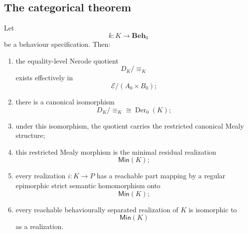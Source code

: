 \subsection{The categorical theorem}
\label{subsec:categorical-myhill-nerode-theorem}

\begin{theorem}
\label{thm:categorical-myhill-nerode}
    Let
    \[
        k:K\to\mathbf{Beh}_0
    \]
    be a behaviour specification. Then:
    \begin{enumerate}
        \item the equality-level Nerode quotient
        \[
            D_K/{\equiv_K}
        \]
        exists effectively in
        \[
            \mathcal E/(A_0\times B_0);
        \]

        \item there is a canonical isomorphism
        \[
            D_K/{\equiv_K}\cong\operatorname{Der}_0(K);
        \]

        \item under this isomorphism, the quotient carries the restricted canonical Mealy structure;

        \item this restricted Mealy morphism is the minimal residual realization
        \[
            \mathsf{Min}(K);
        \]

        \item every realization \(i:K\to P\) has a reachable part mapping by a regular epimorphic strict semantic homomorphism onto
        \[
            \mathsf{Min}(K);
        \]

        \item every reachable behaviourally separated realization of \(K\) is isomorphic to
        \[
            \mathsf{Min}(K)
        \]
        as a realization.
    \end{enumerate}
\end{theorem}
